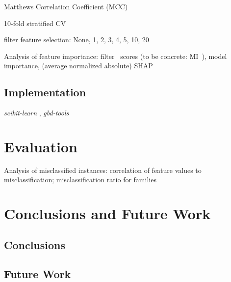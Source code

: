 \documentclass{article}
\begin{document}
Matthews Correlation Coefficient (MCC)~\cite{matthews1975comparison, gorodkin2004comparing}

10-fold stratified CV

filter feature selection: None, 1, 2, 3, 4, 5, 10, 20

Analysis of feature importance: filter~\cite{guyon2003introduction} scores (to be concrete: MI~\cite{kraskov2004estimating}), model importance, (average normalized absolute) SHAP~\cite{lundberg2017unified}

\subsection{Implementation}

\emph{scikit-learn} \cite{pedregosa2011scikit}, \emph{gbd-tools}~\cite{iser2020collaborative}

\section{Evaluation}
\label{sec:evaluation}

Analysis of misclassified instances: correlation of feature values to misclassification; misclassification ratio for families

\section{Conclusions and Future Work}
\label{sec:conclusion}

\subsection{Conclusions}

\subsection{Future Work}

\printbibliography
\end{document}
